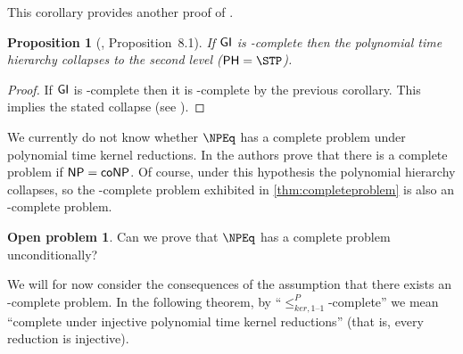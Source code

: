 \documentclass[draft]{article}
\newtheorem{proposition}[proposition]{Proposition}
\theoremstyle{definition} \newtheorem{openproblem}[openproblem]{Open problem}
\theoremstyle{definition} \newtheorem{definition}[definition]{Definition}
\theoremstyle{remark} \newtheorem{remark}[remark]{Remark}
\newcommand{\kri}{\leq^{P}_{ker,1\text{--}1}} %
\begin{document}
This corollary provides another proof of \cite[Proposition~8.1]{bcffm}.

\begin{proposition}[\cite{bcffm}, Proposition~8.1]
  If ${\mathsf{GI}}$ is \NPEq-complete then the polynomial time hierarchy collapses to the second level ($\PH=\STP$).
\end{proposition}
\begin{proof}
  If ${\mathsf{GI}}$ is \NPEq-complete then it is \NP-complete by the previous corollary.
  This implies the stated collapse (see \cite{schoning87}).
\end{proof}

We currently do not know whether $\NPEq$ has a complete problem under polynomial time kernel reductions.
In \cite{bcffm} the authors prove that there is a complete problem if ${\mathsf{NP}}={\mathsf{coNP}}$.
Of course, under this hypothesis the polynomial hierarchy collapses, so the \NPcoNPEq-complete problem exhibited in \autoref{thm:completeproblem} is also an \NPEq-complete problem.
\begin{openproblem}
  Can we prove that $\NPEq$ has a complete problem unconditionally?
\end{openproblem}

We will for now consider the consequences of the assumption that there exists an \NPEq-complete problem.
In the following theorem, by ``$\kri$-complete'' we mean ``complete under injective polynomial time kernel reductions'' (that is, every reduction is injective).
\end{document}
